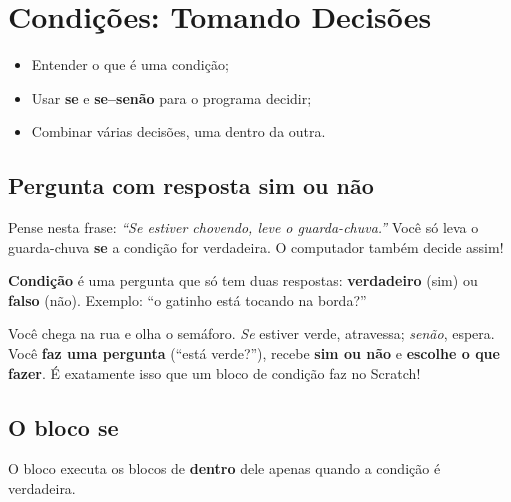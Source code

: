 \chapter{Condições: Tomando Decisões}

\begin{objetivos}
\begin{itemize}
\item Entender o que é uma condição;
\item Usar \textbf{se} e \textbf{se--senão} para o programa decidir;
\item Combinar várias decisões, uma dentro da outra.
\end{itemize}
\end{objetivos}

\section{Pergunta com resposta sim ou não}

Pense nesta frase: \emph{``Se estiver chovendo, leve o guarda-chuva.''} Você só leva o guarda-chuva \textbf{se} a condição for verdadeira. O computador também decide assim!

\begin{vocabulario}
\textbf{Condição} é uma pergunta que só tem duas respostas: \textbf{verdadeiro} (sim) ou \textbf{falso} (não). Exemplo: ``o gatinho está tocando na borda?''
\end{vocabulario}

\begin{pensaassim}
Você chega na rua e olha o semáforo. \emph{Se} estiver verde, atravessa; \emph{senão}, espera. Você \textbf{faz uma pergunta} (``está verde?''), recebe \textbf{sim ou não} e \textbf{escolhe o que fazer}. É exatamente isso que um bloco de condição faz no Scratch!
\end{pensaassim}

\section{O bloco se}

O bloco  executa os blocos de \textbf{dentro} dele apenas quando a condição é verdadeira.

\begin{codigo}
\begin{pilha}
\sbcend
\sbcend
\end{pilha}
\end{codigo}

